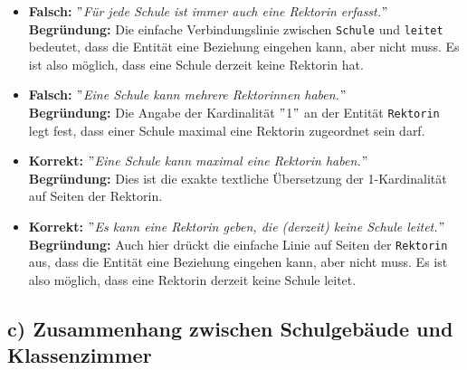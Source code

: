 \documentclass[12pt]{scrartcl}
\begin{document}
    \begin{itemize}
        \item \textbf{Falsch:} \textit{\("\)Für jede Schule ist immer auch eine Rektorin erfasst.\("\)} \\
        \textbf{Begründung:} Die einfache Verbindungslinie zwischen \texttt{Schule} und \texttt{leitet} bedeutet, dass die Entität eine Beziehung eingehen kann, aber nicht muss. Es ist also möglich, dass eine Schule derzeit keine Rektorin hat.

        \item \textbf{Falsch:} \textit{\("\)Eine Schule kann mehrere Rektorinnen haben.\("\)} \\
        \textbf{Begründung:} Die Angabe der Kardinalität \("\)1\("\) an der Entität \texttt{Rektorin} legt fest, dass einer Schule maximal eine Rektorin zugeordnet sein darf.

        \item \textbf{Korrekt:} \textit{\("\)Eine Schule kann maximal eine Rektorin haben.\("\)} \\
        \textbf{Begründung:} Dies ist die exakte textliche Übersetzung der 1-Kardinalität auf Seiten der Rektorin.

        \item \textbf{Korrekt:} \textit{\("\)Es kann eine Rektorin geben, die (derzeit) keine Schule leitet.\("\)} \\
        \textbf{Begründung:} Auch hier drückt die einfache Linie auf Seiten der \texttt{Rektorin} aus, dass die Entität eine Beziehung eingehen kann, aber nicht muss. Es ist also möglich, dass eine Rektorin derzeit keine Schule leitet.
    \end{itemize}

    \subsection*{c) Zusammenhang zwischen Schulgebäude und Klassenzimmer}
\end{document}
